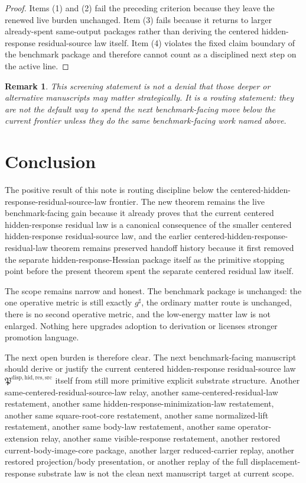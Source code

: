 \documentclass[11pt]{article}
\newcommand{\CompletedMetric}{g^{\sharp}}
\newcommand{\ResidualSourceLawPackage}{\mathfrak P^{\mathrm{disp,hid,res,src}}}
\newtheorem{remark}{Remark}
\begin{document}
\begin{proof}
Items (1) and (2) fail the preceding criterion because they leave the renewed live burden unchanged. Item (3) fails because it returns to larger already-spent same-output packages rather than deriving the centered hidden-response residual-source law itself. Item (4) violates the fixed claim boundary of the benchmark package and therefore cannot count as a disciplined next step on the active line.
\end{proof}

\begin{remark}
This screening statement is not a denial that those deeper or alternative manuscripts may matter strategically. It is a routing statement: they are not the default way to spend the next benchmark-facing move below the current frontier unless they do the same benchmark-facing work named above.
\end{remark}

\section{Conclusion}

The positive result of this note is routing discipline below the centered-hidden-response-residual-source-law frontier. The new theorem remains the live benchmark-facing gain because it already proves that the current centered hidden-response residual law is a canonical consequence of the smaller centered hidden-response residual-source law, and the earlier centered-hidden-response-residual-law theorem remains preserved handoff history because it first removed the separate hidden-response-Hessian package itself as the primitive stopping point before the present theorem spent the separate centered residual law itself.

The scope remains narrow and honest. The benchmark package is unchanged: the one operative metric is still exactly \(\CompletedMetric\), the ordinary matter route is unchanged, there is no second operative metric, and the low-energy matter law is not enlarged. Nothing here upgrades adoption to derivation or licenses stronger promotion language.

The next open burden is therefore clear. The next benchmark-facing manuscript should derive or justify the current centered hidden-response residual-source law \(\ResidualSourceLawPackage\) itself from still more primitive explicit substrate structure. Another same-centered-residual-source-law relay, another same-centered-residual-law restatement, another same hidden-response-minimization-law restatement, another same square-root-core restatement, another same normalized-lift restatement, another same body-law restatement, another same operator-extension relay, another same visible-response restatement, another restored current-body-image-core package, another larger reduced-carrier replay, another restored projection/body presentation, or another replay of the full displacement-response substrate law is not the clean next manuscript target at current scope.
\end{document}
